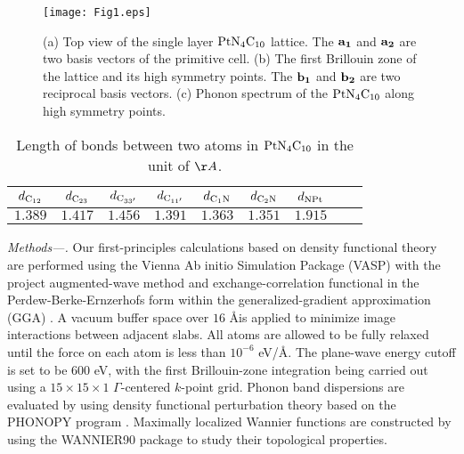 \documentclass[aps,prl,twocolumn,showpacs,superscriptaddress]{revtex4-1}
\begin{document}
\begin{figure}[tb]
	\texttt{[image: Fig1.eps]}
	\caption{(a) Top view of the single layer ${\rm PtN_4C_{10}}$ lattice. The ${\rm {\bf a_1}}$ and ${\rm {\bf a_2}}$ are two basis vectors of the primitive cell. (b) The first Brillouin zone of the lattice and its high symmetry points. The ${\rm {\bf b_1}}$ and ${\rm {\bf b_2}}$ are two reciprocal basis vectors. (c) Phonon spectrum of the ${\rm PtN_4C_{10}}$ along high symmetry points.}
	\label{fig1}
\end{figure}

\begin{table}
	\centering
	\renewcommand\arraystretch{2}
	\begin{tabular}{ccccccccc}
		\hline \hline
		$d_{\rm C_{12}}$ & $d_{\rm C_{23}}$ & $d_{\rm C_{33'}}$ & $d_{\rm C_{11'}}$ & $d_{\rm C_1N}$ & $d_{\rm C_2N}$ & $d_{\rm NPt}$ \\
		\hline
		$1.389$ & $1.417$ & $1.456$ & $1.391$ & $1.363$ & $1.351$ & $1.915$ \\
		\hline \hline
	\end{tabular}
	\caption{Length of bonds between two atoms in ${\rm PtN_4C_{10}}$ in the unit of $\AA$.}
\label{tab-1}
\end{table}

\textit{Methods---.} Our first-principles calculations based on density functional theory are performed using the Vienna Ab initio Simulation Package (VASP) \cite {ref13, ref14} with the project augmented-wave method \cite{ref15} and exchange-correlation functional in the Perdew-Berke-Ernzerhofs form within the generalized-gradient approximation (GGA) \cite {ref16}. A vacuum buffer space over $16$ \AA is applied to minimize image interactions between adjacent slabs. All atoms are allowed to be fully relaxed until the force on each atom is less than $10^{-6}$ eV/\AA. The plane-wave energy cutoff is set to be 600 eV, with the first Brillouin-zone integration being carried out using a $15\times15\times1$ $\Gamma$-centered $k$-point grid. Phonon band dispersions are evaluated by using density functional perturbation theory based on the PHONOPY program \cite {ref42}. Maximally localized Wannier functions are constructed by using the WANNIER90 package \cite {ref17} to study their topological properties.
\end{document}
